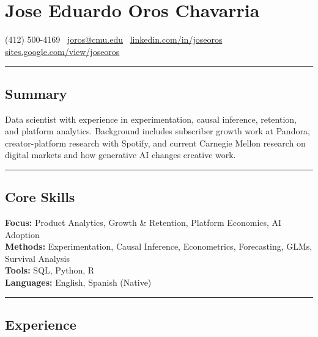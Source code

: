 \documentclass[10pt,letterpaper]{article}
\newcommand{\name}[1]{\section*{#1}}
\newcommand{\sep}{{\color{gray}\,\textbullet\,\,}}
\newcommand{\hsep}{\noindent\textcolor{gray}{\rule{\textwidth}{0.5pt}}}
\newcommand{\block}[1]{\begin{samepage}\hsep\subsection*{#1}\end{samepage}}
\begin{document}
\name{Jose Eduardo Oros Chavarria}

\begin{center}
(412) 500-4169 \sep \href{mailto:joros@cmu.edu}{joros@cmu.edu} \sep \href{https://www.linkedin.com/in/joseoros}{linkedin.com/in/joseoros} \sep \href{https://sites.google.com/view/joseoros}{sites.google.com/view/joseoros}
\end{center}

\block{Summary}

\noindent Data scientist with experience in experimentation, causal inference, retention, and platform analytics. Background includes subscriber growth work at Pandora, creator-platform research with Spotify, and current Carnegie Mellon research on digital markets and how generative AI changes creative work.

\block{Core Skills}

\noindent\textbf{Focus:} Product Analytics, Growth \& Retention, Platform Economics, AI Adoption \\
\textbf{Methods:} Experimentation, Causal Inference, Econometrics, Forecasting, GLMs, Survival Analysis \\
\textbf{Tools:} SQL, Python, R \\
\textbf{Languages:} English, Spanish (Native)

\block{Experience}
\end{document}
